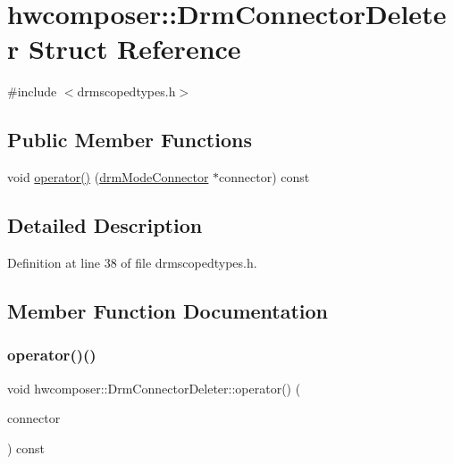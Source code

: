 \hypertarget{structhwcomposer_1_1DrmConnectorDeleter}{}\section{hwcomposer\+:\+:Drm\+Connector\+Deleter Struct Reference}
\label{structhwcomposer_1_1DrmConnectorDeleter}


{\ttfamily \#include $<$drmscopedtypes.\+h$>$}

\subsection*{Public Member Functions}
\begin{DoxyCompactItemize}
\item 
void \mbox{\hyperlink{structhwcomposer_1_1DrmConnectorDeleter_abc3ead91a19b383f40ee06a926a46841}{operator()}} (\mbox{\hyperlink{nativedisplay_8h_a16ea3fc6b16060fd1e1257707006440e}{drm\+Mode\+Connector}} $\ast$connector) const
\end{DoxyCompactItemize}


\subsection{Detailed Description}


Definition at line 38 of file drmscopedtypes.\+h.



\subsection{Member Function Documentation}
\mbox{\label{structhwcomposer_1_1DrmConnectorDeleter_abc3ead91a19b383f40ee06a926a46841}} 
\subsubsection{\texorpdfstring{operator()()}{operator()()}}
{\footnotesize\ttfamily void hwcomposer\+::\+Drm\+Connector\+Deleter\+::operator() (\begin{DoxyParamCaption}\item[{\mbox{\hyperlink{nativedisplay_8h_a16ea3fc6b16060fd1e1257707006440e}{drm\+Mode\+Connector}} $\ast$}]{connector }\end{DoxyParamCaption}) const}



